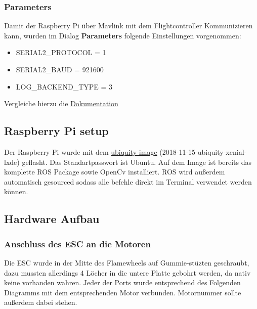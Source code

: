 \documentclass[12pt]{article}
\begin{document}
\subsubsection{Parameters}
Damit der Raspberry Pi über Mavlink mit dem Flightcontroller Kommunizieren kann, wurden im Dialog \textbf{Parameters} folgende Einstellungen vorgenommen:
\begin{itemize}
\item SERIAL2\_PROTOCOL = 1
\item SERIAL2\_BAUD = 921600
\item LOG\_BACKEND\_TYPE = 3
\end{itemize}
Vergleiche hierzu die \hyperlink{http://ardupilot.org/dev/docs/raspberry-pi-via-mavlink.html}{Dokumentation}

\subsection{Raspberry Pi setup}
Der Raspberry Pi wurde mit dem \hyperlink{https://downloads.ubiquityrobotics.com/pi.html}{ubiquity image} (2018-11-15-ubiquity-xenial-lxde) geflasht.
Das Standartpasswort ist Ubuntu.
Auf dem Image ist bereits das komplette ROS Package sowie OpenCv installiert.
ROS wird außerdem automatisch gesourced sodass alle befehle direkt im Terminal verwendet werden können.
\subsection{Hardware Aufbau}

\subsubsection{Anschluss des ESC an die Motoren}
Die ESC wurde in der Mitte des Flamewheels auf Gummie-stüzten geschraubt, dazu mussten allerdings 4 Löcher in die untere Platte gebohrt werden, da nativ keine vorhanden wahren. Jeder der Ports wurde entsprechend des Folgenden Diagramms mit dem entsprechenden Motor verbunden.
Motornummer sollte außerdem dabei stehen.
\end{document}
